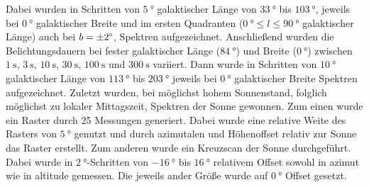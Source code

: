 Dabei wurden in Schritten von $\SI{5}{\degree}$ galaktischer Länge von $\SI{33}{\degree}$ bis $\SI{103}{\degree}$, jeweils bei $\SI{0}{\degree}$ galaktischer Breite und im ersten Quadranten ($\SI{0}{\degree} \le l \le \SI{90}{\degree}$ galaktischer Länge) auch bei $b=\pm \si{2}{\degree}$, Spektren aufgezeichnet.
Anschließend wurden die Belichtungsdauern bei fester galaktischer Länge ($\SI{84}{\degree}$) und Breite ($\SI{0}{\degree}$) zwischen $\SI{1}{\second}$, $\SI{3}{\second}$, $\SI{10}{\second}$, $\SI{30}{\second}$, $\SI{100}{\second}$ und $\SI{300}{\second}$ variiert.
Dann wurde in Schritten von $\SI{10}{\degree}$ galaktischer Länge von $\SI{113}{\degree}$ bis $\SI{203}{\degree}$ jeweils bei $\SI{0}{\degree}$ galaktischer Breite Spektren aufgezeichnet.
Zuletzt wurden, bei möglichst hohem Sonnenstand, folglich möglichst zu lokaler Mittagszeit, Spektren der Sonne gewonnen.
Zum einen wurde ein Raster durch 25 Messungen generiert.
Dabei wurde eine relative Weite des Rasters von $\SI{5}{\degree}$ genutzt und durch azimutalen und Höhenoffset relativ zur Sonne das Raster erstellt.
Zum anderen wurde ein Kreuzscan der Sonne durchgeführt.
Dabei wurde in $\SI{2}{\degree}$-Schritten von $\SI{-16}{\degree}$ bis $\SI{16}{\degree}$ relativem Offset sowohl in azimut wie in altitude gemessen. Die jeweils ander Größe wurde auf $\SI{0}{\degree}$ Offset gesetzt.